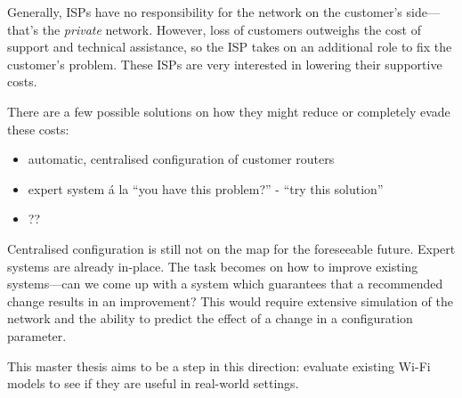 Generally, ISPs have no responsibility for the network on the customer's side---that's the \emph{private} network. However, loss of customers outweighs the cost of support and technical assistance, so the ISP takes on an additional role to fix the customer's problem. These ISPs are very interested in lowering their supportive costs.

There are a few possible solutions on how they might reduce or completely evade these costs:

\begin{itemize}
    \item automatic, centralised configuration of customer routers
    \item expert system á la ``you have this problem?'' - ``try this solution''
    \item ??
\end{itemize}


Centralised configuration is still not on the map for the foreseeable future. Expert systems are already in-place. The task becomes on how to improve existing systems---can we come up with a system which guarantees that a recommended change results in an improvement? This would require extensive simulation of the network and the ability to predict the effect of a change in a configuration parameter.

This master thesis aims to be a step in this direction: evaluate existing Wi-Fi models to see if they are useful in real-world settings.














